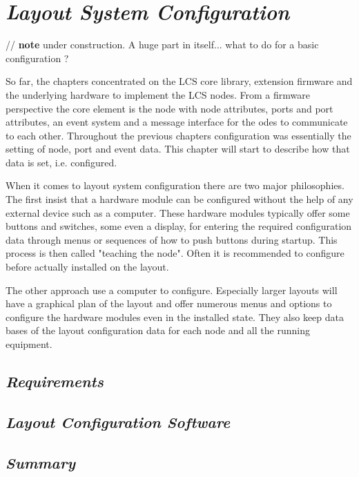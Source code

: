 \chapter{\textit{Layout System Configuration}}

// \textbf{note} under construction. A huge part in itself... what to do for a basic configuration ?

So far, the chapters concentrated on the LCS core library, extension firmware and the underlying hardware to implement the LCS nodes. From a firmware perspective the core element is the node with node attributes, ports and port attributes, an event system and a message interface for the odes to communicate to each other. Throughout the previous chapters configuration was essentially the setting of node, port and event data. This chapter will start to describe how that data is set, i.e. configured.

When it comes to layout system configuration there are two major philosophies. The first insist that a hardware module can be configured without the help of any external device such as a computer. These hardware modules typically offer some buttons and switches, some even a display, for entering the required configuration data through menus or sequences of how to push buttons during startup. This process is then called "teaching the node". Often it is recommended to configure before actually installed on the layout.

The other approach use a computer to configure. Especially larger layouts will have a graphical plan of the layout and offer numerous menus and options to configure the hardware modules even in the installed state. They also keep data bases of the layout configuration data for each node and all the running equipment.

\section{\textit{Requirements}}

\section{\textit{Layout Configuration Software}}

\section{\textit{Summary}}
